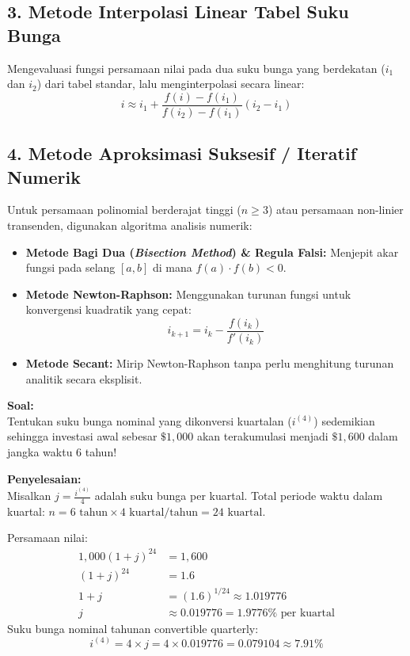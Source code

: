 \documentclass[11pt,a4paper]{article}
\begin{document}
\subsection{3. Metode Interpolasi Linear Tabel Suku Bunga}
Mengevaluasi fungsi persamaan nilai pada dua suku bunga yang berdekatan ($i_1$ dan $i_2$) dari tabel standar, lalu menginterpolasi secara linear:
\begin{equation}
    i \approx i_1 + \frac{f(i) - f(i_1)}{f(i_2) - f(i_1)} (i_2 - i_1)
\end{equation}

\subsection{4. Metode Aproksimasi Suksesif / Iteratif Numerik}
Untuk persamaan polinomial berderajat tinggi ($n \ge 3$) atau persamaan non-linier transenden, digunakan algoritma analisis numerik:
\begin{itemize}[leftmargin=1.5em]
    \item \textbf{Metode Bagi Dua (\textit{Bisection Method}) \& Regula Falsi:} Menjepit akar fungsi pada selang $[a, b]$ di mana $f(a) \cdot f(b) < 0$.
    \item \textbf{Metode Newton-Raphson:} Menggunakan turunan fungsi untuk konvergensi kuadratik yang cepat:
    \begin{equation}
        i_{k+1} = i_k - \frac{f(i_k)}{f'(i_k)}
    \end{equation}
    \item \textbf{Metode Secant:} Mirip Newton-Raphson tanpa perlu menghitung turunan analitik secara eksplisit.
\end{itemize}

\begin{examplebox}
\textbf{Soal:}\\
Tentukan suku bunga nominal yang dikonversi kuartalan ($i^{(4)}$) sedemikian sehingga investasi awal sebesar $\$1{,}000$ akan terakumulasi menjadi $\$1{,}600$ dalam jangka waktu 6 tahun!

\vspace{0.5em}
\textbf{Penyelesaian:}\\
Misalkan $j = \frac{i^{(4)}}{4}$ adalah suku bunga per kuartal.
Total periode waktu dalam kuartal: $n = 6 \text{ tahun} \times 4 \text{ kuartal/tahun} = 24 \text{ kuartal}$.

Persamaan nilai:
\begin{align*}
    1{,}000 (1 + j)^{24} &= 1{,}600 \\[0.4em]
    (1 + j)^{24} &= 1.6 \\[0.4em]
    1 + j &= (1.6)^{1/24} \approx 1.019776 \\[0.4em]
    j &\approx 0.019776 = 1.9776\% \text{ per kuartal}
\end{align*}
Suku bunga nominal tahunan convertible quarterly:
\begin{equation*}
    i^{(4)} = 4 \times j = 4 \times 0.019776 = 0.079104 \approx 7.91\%
\end{equation*}
\end{examplebox}
\end{document}
